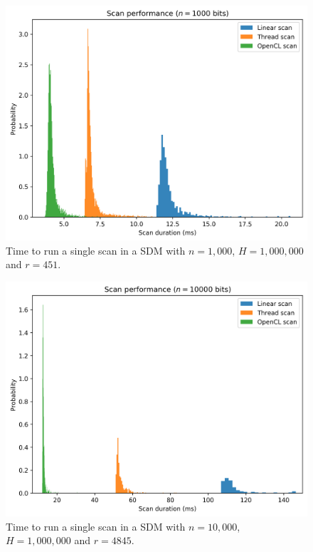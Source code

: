\begin{figure}[!htb]
\centering\includegraphics[width=\textwidth]{images02/performance/imac-scans-1000.png}
\caption{Time to run a single scan in a SDM with $n=1,000$, $H=1,000,000$ and $r=451$.
\label{fig:perf-imac-scan-1000}}
\end{figure}

\begin{figure}[!htb]
\centering\includegraphics[width=\textwidth]{images02/performance/imac-scans-10k.png}
\caption{Time to run a single scan in a SDM with $n=10,000$, $H=1,000,000$ and $r=4845$.
\label{fig:perf-imac-scan-10k}}
\end{figure}

